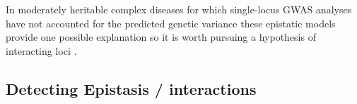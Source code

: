 In moderately heritable complex diseases for which single-locus GWAS analyses have not accounted for the predicted genetic variance these epistatic models provide one possible explanation so it is worth pursuing a hypothesis of interacting loci \cite{culverhouse2002perspective}.




\subsection{Detecting Epistasis / interactions}

